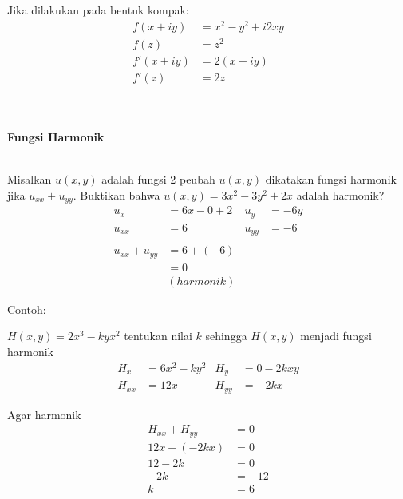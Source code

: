 \documentclass{article}
\begin{document}
    Jika dilakukan pada bentuk kompak:
    \begin{align}
        f(x+iy)     &= x^2 -y^2 + i2xy
        \nonumber\\
        f(z)        &= z^2
        \nonumber\\
        f'(x+iy)    &= 2(x+iy)
        \nonumber\\
        f'(z)       &= 2z
        \nonumber 
    \end{align}
    \leavevmode\\ \\


    \newpage
    \begin{center}
        \textbf{Fungsi Harmonik}
    \end{center}
    \leavevmode\\
    
    Misalkan $u(x,y)$ adalah fungsi 2 peubah $u(x,y)$ dikatakan fungsi harmonik jika $u_{xx} + u_{yy}$. Buktikan bahwa $u(x,y) = 3x^2 - 3y^2 + 2x$ adalah harmonik?
    \begin{align}
        u_x     &= 6x-0+2        &u_y     &= -6y
        \nonumber\\
        u_{xx}  &= 6             &u_{yy}  &= -6
        \nonumber\\
        \nonumber\\
        u_{xx} + u_{yy} &= 6 + (-6)
        \nonumber\\
                        &= 0
        \nonumber\\
                        &(harmonik)
        \nonumber
    \end{align}

    Contoh: 
    
    $H(x,y) =2x^3 -kyx^2$ tentukan nilai $k$ sehingga $H(x,y)$ menjadi fungsi harmonik
    \begin{align}
        H_x  &= 6x^2-ky^2    &H_y    &= 0-2kxy
        \nonumber\\
        H_{xx} &= 12x          &H_{yy} &= -2kx
        \nonumber
    \end{align}
    
    Agar harmonik
    \begin{align}
        H_{xx} + H_{yy} &= 0
        \nonumber\\
        12x + (-2kx)    &= 0
        \nonumber\\
        12 - 2k         &= 0
        \nonumber\\
        -2k             &= -12
        \nonumber\\
        k               &= 6
        \nonumber
    \end{align} 
\end{document}

